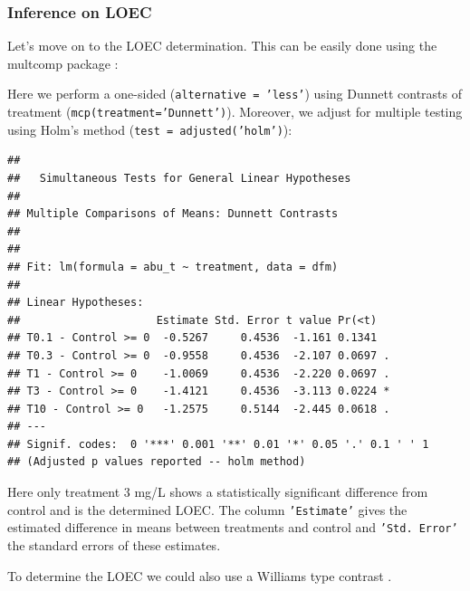 \subsubsection{Inference on LOEC}
Let's move on to the LOEC determination.
This can be easily done using the multcomp package \citep{hothorn_simultaneous_2008}:

Here we perform a one-sided (\texttt{alternative = 'less'}) using Dunnett contrasts of treatment (\texttt{mcp(treatment='Dunnett')}).
Moreover, we adjust for multiple testing using Holm's method (\texttt{test = adjusted('holm')}):
\begin{knitrout}
\color{fgcolor}\small\begin{kframe}
\begin{alltt}
\hlstd{(}  \hlstd{=} \hlstd{(} \hlstd{=} \hlstd{),}  
                 \hlstd{=} \hlstd{),}
                 \hlstd{=} \hlstd{(}\hlstd{))}
\end{alltt}
\begin{verbatim}
## 
## 	 Simultaneous Tests for General Linear Hypotheses
## 
## Multiple Comparisons of Means: Dunnett Contrasts
## 
## 
## Fit: lm(formula = abu_t ~ treatment, data = dfm)
## 
## Linear Hypotheses:
##                     Estimate Std. Error t value Pr(<t)  
## T0.1 - Control >= 0  -0.5267     0.4536  -1.161 0.1341  
## T0.3 - Control >= 0  -0.9558     0.4536  -2.107 0.0697 .
## T1 - Control >= 0    -1.0069     0.4536  -2.220 0.0697 .
## T3 - Control >= 0    -1.4121     0.4536  -3.113 0.0224 *
## T10 - Control >= 0   -1.2575     0.5144  -2.445 0.0618 .
## ---
## Signif. codes:  0 '***' 0.001 '**' 0.01 '*' 0.05 '.' 0.1 ' ' 1
## (Adjusted p values reported -- holm method)
\end{verbatim}
\end{kframe}
\end{knitrout}

Here only treatment 3 mg/L shows a statistically significant difference from control and is the determined LOEC.
The column \texttt{'Estimate'} gives the estimated difference in means between treatments and control and \texttt{'Std. Error'} the standard errors of these estimates.


To determine the LOEC we could also use a Williams type contrast  \citep{bretz_multiple_2010}. 

